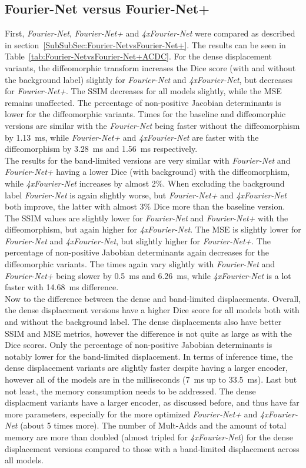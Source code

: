 \subsection{Fourier-Net versus Fourier-Net+} \label{SubSec:ResultsFourier-NetvsFourier-Net+ACDC}
First, \emph{Fourier-Net}, \emph{Fourier-Net+} and \emph{4xFourier-Net} were compared as described in section~\ref{SubSubSec:Fourier-NetvsFourier-Net+}. The results can be seen in Table~\ref{tab:Fourier-NetvsFourier-Net+ACDC}. For the dense displacement variants, the diffeomorphic transform increases the Dice score (with and without the background label) slightly for \emph{Fourier-Net} and \emph{4xFourier-Net}, but decreases for \emph{Fourier-Net+}. The SSIM decreases for all models slightly, while the MSE remains unaffected. The percentage of non-positive Jacobian determinants is lower for the diffeomorphic variants. Times for the baseline and diffeomorphic versions are similar with the \emph{Fourier-Net} being faster without the diffeomorphism by 1.13~ms, while \emph{Fourier-Net+} and \emph{4xFourier-Net} are faster with the diffeomorphism by 3.28~ms and 1.56~ms respectively. \\
The results for the band-limited versions are very similar with \emph{Fourier-Net} and \emph{Fourier-Net+} having a lower Dice (with background) with the diffeomorphism, while \emph{4xFourier-Net} increases by almost 2$\%$. When excluding the background label \emph{Fourier-Net} is again slightly worse, but \emph{Fourier-Net+} and \emph{4xFourier-Net} both improve, the latter with almost 3$\%$ Dice more than the baseline version. The SSIM values are slightly lower for \emph{Fourier-Net} and \emph{Fourier-Net+} with the diffeomorphism, but again higher for \emph{4xFourier-Net}. The MSE is slightly lower for \emph{Fourier-Net} and \emph{4xFourier-Net}, but slightly higher for \emph{Fourier-Net+}. The percentage of non-positive Jabobian determinants again decreases for the diffeomorphic variants. The times again vary slightly with \emph{Fourier-Net} and \emph{Fourier-Net+} being slower by 0.5~ms and 6.26~ms, while \emph{4xFourier-Net} is a lot faster with 14.68~ms difference.\\
Now to the difference between the dense and band-limited displacements. Overall, the dense displacement versions have a higher Dice score for all models both with and without the background label.  The dense displacements also have better SSIM and MSE metrics, however the difference is not quite as large as with the Dice scores.  Only the percentage of non-positive Jabobian determinants is notably lower for the band-limited displacement. In terms of inference time, the dense displacement variants are slightly faster despite having a larger encoder, however all of the models are in the milliseconds (7~ms up to 33.5~ms). Last but not least, the memory consumption needs to be addressed. The dense displacment variants have a larger encoder, as discussed before, and thus have far more parameters, especially for the more optimized \emph{Fourier-Net+} and \emph{4xFourier-Net} (about 5 times more). The number of Mult-Adds and the amount of total memory are more than doubled (almost tripled for \emph{4xFourier-Net}) for the dense displacement versions compared to those with a band-limited displacement across all models.

